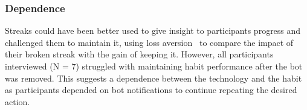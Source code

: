 \subsubsection*{Dependence}
Streaks could have been better used to give insight to participants progress and challenged them to maintain it, using loss aversion~\cite{loss_aversion} to compare the impact of their broken streak with the gain of keeping it. However, all participants interviewed (N = 7) struggled with maintaining habit performance after the bot was removed. This suggests a dependence between the technology and the habit as participants depended on bot notifications to continue repeating the desired action.


